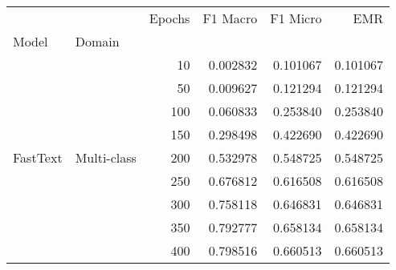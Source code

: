 \begin{tabular}{llrrrr}
\toprule
         &             &  Epochs &  F1 Macro &   F1 Micro &       EMR \\
Model & Domain &         &           &            &           \\
\midrule
\multirow{9}{*}{FastText} & \multirow{9}{*}{Multi-class} &      10 &  0.002832 &   0.101067 &  0.101067 \\
         &             &      50 &  0.009627 &   0.121294 &  0.121294 \\
         &             &     100 &  0.060833 &   0.253840 &  0.253840 \\
         &             &     150 &  0.298498 &   0.422690 &  0.422690 \\
         &             &     200 &  0.532978 &   0.548725 &  0.548725 \\
         &             &     250 &  0.676812 &   0.616508 &  0.616508 \\
         &             &     300 &  0.758118 &   0.646831 &  0.646831 \\
         &             &     350 &  0.792777 &   0.658134 &  0.658134 \\
         &             &     400 &  0.798516 &   0.660513 &  0.660513 \\
\bottomrule
\end{tabular}
